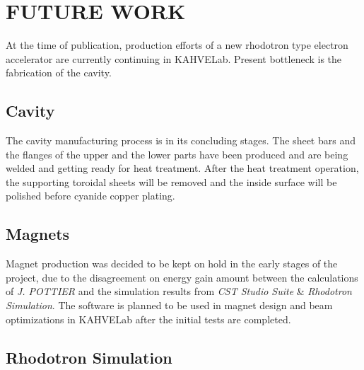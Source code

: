 \documentclass[a4paper,oneside,12pt]{report}
\numberwithin{equation}{chapter}
\begin{document}
\newpage






\newpage


\chapter{FUTURE WORK}

At the time of publication, production efforts of a new rhodotron type electron accelerator are currently continuing in KAHVELab. 
Present bottleneck is the fabrication of the cavity.

\section{Cavity}
The cavity manufacturing process is in its concluding stages.
The sheet bars and the flanges of the upper and the lower parts have been produced and are being welded and getting ready for heat treatment.
After the heat treatment operation, 
the supporting toroidal sheets will be removed and the inside surface will be polished before cyanide copper plating. 

\section{Magnets}
Magnet production was decided to be kept on hold in the early stages of the project, 
due to the disagreement on energy gain amount between the calculations of \textit{J. POTTIER} \cite{rhodo_pottier} 
and the simulation results from \textit{CST Studio Suite} \& \textit{Rhodotron Simulation}. 
The software is planned to be used in magnet design and beam optimizations in KAHVELab after the initial tests are completed.

\section{Rhodotron Simulation}
\end{document}
